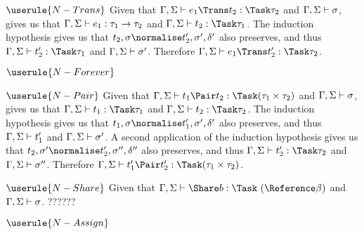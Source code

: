 \case
  {$\userule{N-Trans}$}
  {Given that $\Gamma,\Sigma\infers e_1\Trans t_2:\Task\tau_2$ and $\Gamma,\Sigma\vdash\sigma$,  gives us that $\Gamma,\Sigma\vdash e_1:\tau_1\rightarrow \tau_2$ and $\Gamma,\Sigma\infers t_2:\Task\tau_1$.
  The induction hypothesis gives us that $t_2,\sigma\normalise t_2',\sigma',\delta'$ also preserves, and thus $\Gamma,\Sigma\infers t_2':\Task\tau_1$ and $\Gamma,\Sigma\vdash\sigma'$.
  Therefore $\Gamma,\Sigma\infers e_1\Trans t_2':\Task\tau_2$.}

\case
  {$\userule{N-Forever}$}
  {}

\case
  {$\userule{N-Pair}$}
  {Given that $\Gamma,\Sigma\infers t_1\Pair t_2:\Task (\tau_1\times\tau_2)$ and $\Gamma,\Sigma\vdash\sigma$,  gives us that $\Gamma,\Sigma\infers t_1:\Task \tau_1$ and $\Gamma,\Sigma\infers t_2:\Task \tau_2$.
  The induction hypothesis gives us that $t_1,\sigma\normalise t_1',\sigma',\delta'$ also preserves,
  and thus $\Gamma,\Sigma\vdash t_1'$ and $\Gamma,\Sigma\vdash \sigma'$.
  A second application of the induction hypothesis gives us that $t_2,\sigma'\normalise t_2',\sigma'',\delta''$ also preserves, and thus $\Gamma,\Sigma\infers t_2':\Task\tau_2$ and $\Gamma,\Sigma\vdash \sigma''$.
  Therefore $\Gamma,\Sigma\infers t_1'\Pair t_2':\Task (\tau_1\times\tau_2)$.}

\case
  {$\userule{N-Share}$}
  {Given that $\Gamma,\Sigma\infers \Share b:\Task\ (\Reference \beta)$ and $\Gamma,\Sigma\vdash\sigma$.
  ?????? 
  }

\case
  {$\userule{N-Assign}$}
  {}
